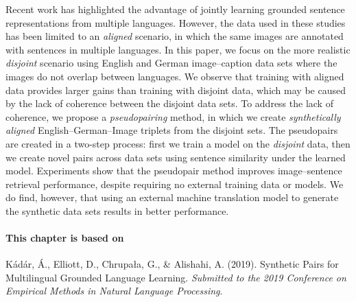 Recent work has highlighted the advantage of jointly learning grounded sentence representations 
from multiple languages. 
However, the data used in these studies has 
been limited to an \emph{aligned} scenario, in which
the same images are annotated with sentences 
in multiple languages. In this paper, we focus on the more realistic 
\emph{disjoint} scenario using English and German
image--caption data sets where the images
do not overlap between languages. 
We observe that training with aligned data provides larger gains than training with disjoint data, which may be caused by the lack of coherence between the disjoint data sets. 
To address the lack of coherence, we propose a
\emph{pseudopairing} method, in which we create \emph{synthetically aligned} 
English--German--Image triplets from the disjoint sets. The pseudopairs are created in a two-step process:
first we train a model on the 
\emph{disjoint} data, then we create novel pairs across data sets using sentence similarity 
under the learned model.
Experiments show that the pseudopair method improves 
image--sentence retrieval performance, 
despite requiring no external training data or models. 
We do find, however, that using an external machine translation model to generate the synthetic data sets results
in better performance.




\newpage

\paragraph{This chapter is based on} Kádár, Á., Elliott, D., Chrupała, G., \& Alishahi, A. (2019).
Synthetic Pairs for Multilingual Grounded Language Learning. \textit{Submitted to the 2019 Conference on 
Empirical Methods in Natural Language Processing}.

